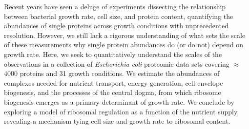 Recent years have seen a deluge of experiments dissecting the relationship
between bacterial growth rate, cell size, and protein content, quantifying
the abundances of single proteins across growth conditions with unprecedented
resolution. However, we still lack a rigorous understanding of what sets the
scale of these measurements why single protein abundances do (or do not)
depend on growth rate. Here, we seek to quantitatively understand the scales
of the observations in a collection of \textit{Escherichia coli} proteomic
data sets covering $\approx$ 4000 proteins and 31 growth conditions. We
estimate the abundances of complexes needed for nutrient transport, energy
generation, cell envelope biogenesis, and the processes of the central dogma,
from which ribosome biogenesis emerges as a primary determinant of growth
rate. We conclude by exploring a model of ribosomal regulation as a function
of the nutrient supply, revealing a mechanism tying cell size and growth rate
to ribosomal content.
